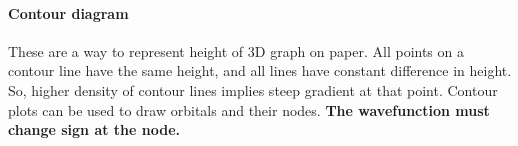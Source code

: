\documentclass[11pt]{article}
\begin{document}
\paragraph{Contour diagram} These are a way to represent height of $3$D graph on paper. All points on a contour line have the same height, and all lines have constant difference in height. So, higher density of contour lines implies steep gradient at that point. Contour plots can be used to draw orbitals and their nodes. \textbf{The wavefunction must change sign at the node.}
\end{document}
